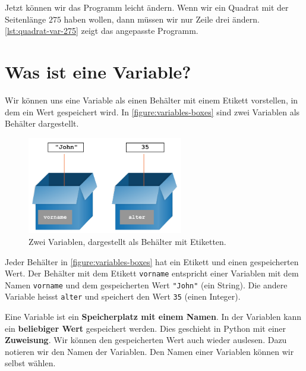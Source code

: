 Jetzt können wir das Programm leicht ändern. Wenn wir ein Quadrat mit der Seitenlänge $275$ haben wollen, dann müssen wir nur Zeile drei ändern. \autoref{lst:quadrat-var-275} zeigt das angepasste Programm.

\section{Was ist eine Variable?}
\label{sec:was-ist-eine-variable}

Wir können uns eine Variable als einen Behälter mit einem Etikett vorstellen, in dem ein Wert gespeichert wird. In \autoref{figure:variables-boxes} sind zwei Variablen als Behälter dargestellt.

\begin{figure}[htb]
\centering
\includegraphics[height=4.25cm]{boxesVariable}
\caption{Zwei Variablen, dargestellt als Behälter mit Etiketten.\protect\footnotemark}
\label{figure:variables-boxes}
\end{figure}


Jeder Behälter in \autoref{figure:variables-boxes} hat ein Etikett und einen gespeicherten Wert. Der Behälter mit dem Etikett \lstinline[language={python3}]{vorname} entspricht einer Variablen mit dem Namen \lstinline[language={python3}]{vorname} und dem gespeicherten Wert \lstinline[language={python3}]{"John"} (ein String). Die andere Variable heisst \lstinline[language={python3}]{alter} und speichert den Wert \lstinline[language={python3}]{35} (einen Integer).

\begin{definition}[Variable]
Eine Variable ist ein \textbf{Speicherplatz mit einem Namen}. In der Variablen kann ein \textbf{beliebiger Wert} gespeichert werden. Dies geschieht in Python mit einer \textbf{Zuweisung}. Wir können den gespeicherten Wert auch wieder auslesen. Dazu notieren wir den Namen der Variablen. Den Namen einer Variablen können wir selbst wählen.
\end{definition}

